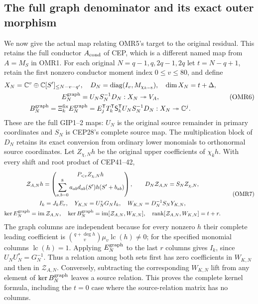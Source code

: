 \documentclass[11pt,a4paper]{article}
\begin{document}
\subsection{The full graph denominator and its exact outer morphism}

We now give the actual map relating OMR5's target to the original
residual. This retains the full conductor $A_{\rm cond}$ of CEP,
which is a different named map from $A=M_S$ in OMR1. For each
original $N=q-1,q,2q-1,2q$ let $t=N-q+1$, retain the first
nonzero conductor moment index $0\le v\le80$, and define
\[
 \begin{gathered}
 X_N=\mathbb C^v\oplus\mathbb C[S']_{\le N-v-q'},\quad
 D_N=\operatorname{diag}(I_v,M_{\chi_{k-8}}),\quad
 \dim X_N=t+\Delta,\\
 E_N^{\rm graph}=U_NS_N^{-1}D_N:X_N\twoheadrightarrow V_A,\\
 B_N^{\rm graph}=\Xi_k^{\rm fix}E_N^{\rm graph}
       =E_j^{\mathsf T}T_k^{\mathsf T}\mathsf S_k^{\mathsf T}
                       U_NS_N^{-1}D_N:X_N\twoheadrightarrow\mathbb C^j.
 \end{gathered}\tag{OMR6}
\]
These are the full GIP1--2 maps: $U_N$ is the original source
remainder in primary coordinates and $S_N$ is CEP28's complete
source map. The multiplication block of $D_N$ retains its exact
conversion from ordinary lower monomials to orthonormal source
coordinates. Let $Z_{\chi,N}h$ be the original upper coefficients
of $\chi_kh$. With every shift and root product of CEP41--42,
\[
 \begin{gathered}
 \mathcal Z_{A,N}h=
   \begin{pmatrix}P_{<v}Z_{\chi,N}h\\
     \displaystyle\sum_{a,b=0}^8a_{ab}d_{ab}(S')h(S'+b_{ab})
   \end{pmatrix},\qquad
 D_N\mathcal Z_{A,N}=S_NZ_{\chi,N},\\
 I_k=J_kE_r,\quad Y_{K,N}=U_N^*G_NI_k,\quad
 W_{K,N}=D_N^{-1}S_NY_{K,N},\\
 \ker E_N^{\rm graph}=\operatorname{im}\mathcal Z_{A,N},\quad
 \ker B_N^{\rm graph}
       =\operatorname{im}[\mathcal Z_{A,N},W_{K,N}],\quad
 \operatorname{rank}[\mathcal Z_{A,N},W_{K,N}]=t+r.
 \end{gathered}\tag{OMR7}
\]
The graph columns are independent because for every nonzero $h$
their complete leading coefficient is
$\binom{q+\deg h}{v}\mu_v\operatorname{lc}(h)\ne0$;
for the specified monomial columns $\operatorname{lc}(h)=1$.
Applying $E_N^{\rm graph}$ to the last $r$ columns gives $I_k$,
since $U_NU_N^*=G_N^{-1}$. Thus a relation among both sets first
has zero coefficients in $W_{K,N}$ and then in $\mathcal Z_{A,N}$.
Conversely, subtracting the corresponding $W_{K,N}$ lift from any
element of $\ker B_N^{\rm graph}$ leaves a source relation.
This proves the complete kernel formula, including the $t=0$ case
where the source-relation matrix has no columns.
\end{document}
